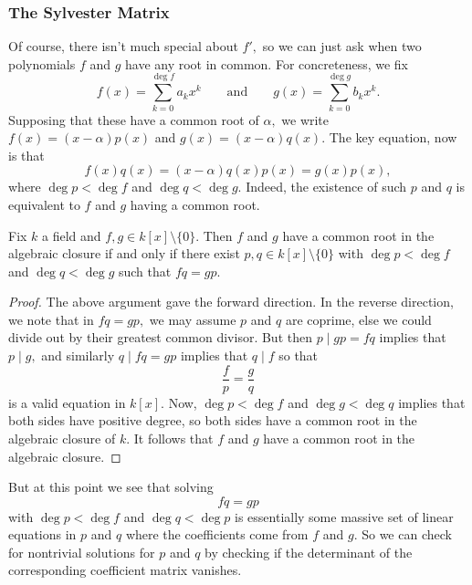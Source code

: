 \documentclass[../notes.tex]{subfiles}
\begin{document}
\subsubsection{The Sylvester Matrix}
Of course, there isn't much special about $f',$ so we can just ask when two polynomials $f$ and $g$ have any root in common. For concreteness, we fix
\[f(x)=\sum_{k=0}^{\deg f}a_kx^k\qquad\text{and}\qquad g(x)=\sum_{k=0}^{\deg g}b_kx^k.\]
Supposing that these have a common root of $\alpha,$ we write $f(x)=(x-\alpha)p(x)$ and $g(x)=(x-\alpha)q(x).$ The key equation, now is that
\[f(x)q(x)=(x-\alpha)q(x)p(x)=g(x)p(x),\]
where $\deg p<\deg f$ and $\deg q<\deg g.$ Indeed, the existence of such $p$ and $q$ is equivalent to $f$ and $g$ having a common root.
\begin{lemma}
	Fix $k$ a field and $f,g\in k[x]\setminus\{0\}.$ Then $f$ and $g$ have a common root in the algebraic closure if and only if there exist $p,q\in k[x]\setminus\{0\}$ with $\deg p<\deg f$ and $\deg q<\deg g$ such that $fq=gp.$
\end{lemma}
\begin{proof}
	The above argument gave the forward direction. In the reverse direction, we note that in $fq=gp,$ we may assume $p$ and $q$ are coprime, else we could divide out by their greatest common divisor. But then $p\mid gp=fq$ implies that $p\mid g,$ and similarly $q\mid fq=gp$ implies that $q\mid f$ so that
	\[\frac fp=\frac gq\]
	is a valid equation in $k[x].$ Now, $\deg p<\deg f$ and $\deg g<\deg q$ implies that both sides have positive degree, so both sides have a common root in the algebraic closure of $k.$ It follows that $f$ and $g$ have a common root in the algebraic closure.
\end{proof}
But at this point we see that solving
\[fq=gp\]
with $\deg p<\deg f$ and $\deg q<\deg p$ is essentially some massive set of linear equations in $p$ and $q$ where the coefficients come from $f$ and $g.$ So we can check for nontrivial solutions for $p$ and $q$ by checking if the determinant of the corresponding coefficient matrix vanishes.
\end{document}

